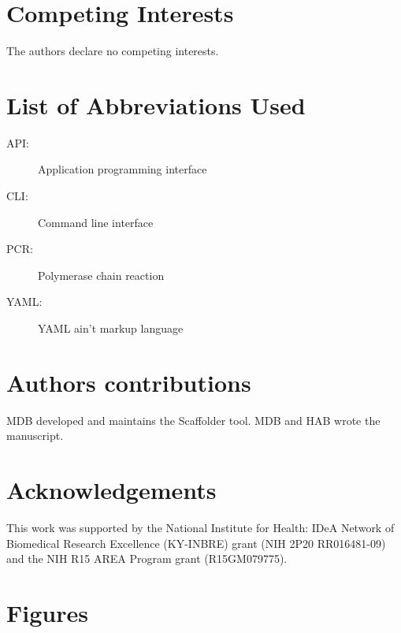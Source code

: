 \documentclass[10pt]{bmc_article}
\newenvironment{bmcformat}{\begin{raggedright}\baselineskip20pt\sloppy\setboolean{publ}{false}}{\end{raggedright}\baselineskip20pt\sloppy}
\begin{document}
\begin{bmcformat}
\clearpage

\section*{Competing Interests} %

The authors declare no competing interests.

\section*{List of Abbreviations Used} %

  \begin{description}
    \item[API:] Application programming interface
    \item[CLI:] Command line interface
    \item[PCR:] Polymerase chain reaction
    \item[YAML:] YAML ain't markup language\cite{yaml}
  \end{description}

\section*{Authors contributions} %

MDB developed and maintains the Scaffolder tool. MDB and HAB wrote the
manuscript.

\section*{Acknowledgements} %

This work was supported by the National Institute for Health: IDeA Network of
Biomedical Research Excellence (KY-INBRE) grant (NIH 2P20 RR016481-09) and the
NIH R15 AREA Program grant (R15GM079775).

\clearpage

{
   }     %


\clearpage

\section*{Figures} %


\end{bmcformat}
\end{document}
